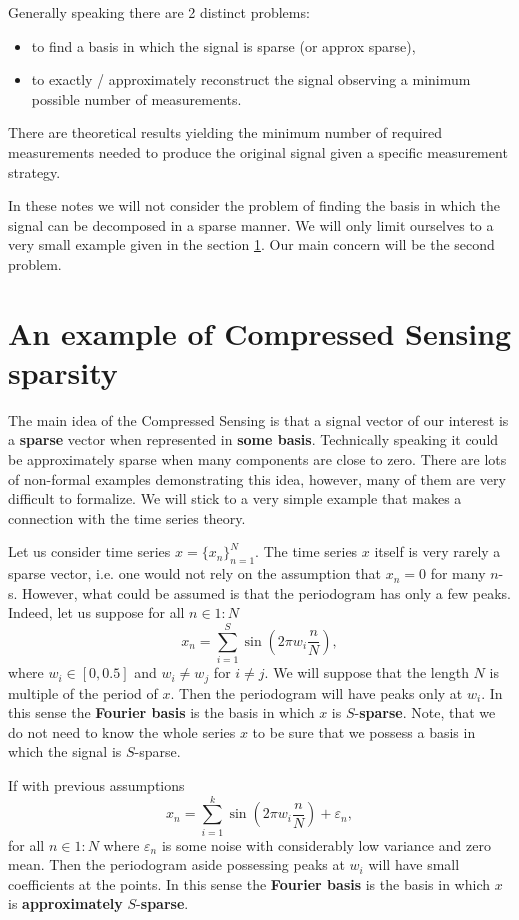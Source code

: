 \documentclass[11pt]{article}
\numberwithin{equation}{section}
\theoremstyle{definition}
\begin{document}
Generally speaking there are 2 distinct problems:
\begin{itemize}
    \item to find a basis in which the signal is sparse (or approx sparse),
    \item to exactly / approximately reconstruct the signal observing a minimum possible number of measurements.
\end{itemize}
There are theoretical results yielding the minimum number of required measurements needed to produce the original signal given a specific measurement strategy.

In these notes we will not consider the problem of finding the basis in which the signal can be decomposed in a sparse manner.
We will only limit ourselves to a very small example given in the section \ref{sec:motivation}.
Our main concern will be the second problem.

\section{An example of Compressed Sensing sparsity}
\label{sec:motivation}
The main idea of the Compressed Sensing is that a signal vector of our interest is a \textbf{sparse} vector when represented in \textbf{some basis}.
Technically speaking it could be approximately sparse when many components are close to zero.
There are lots of non-formal examples demonstrating this idea, however, many of them are very difficult to formalize.
We will stick to a very simple example that makes a connection with the time series theory.

Let us consider time series $x = \{x_n\}_{n=1}^N$.
The time series $x$ itself is very rarely a sparse vector, i.e. one would not rely on the assumption that $x_n = 0$ for many $n$-s.
However, what could be assumed is that the periodogram has only a few peaks.
Indeed, let us suppose for all $n \in 1:N$
$$ x_n = \sum_{i=1}^S \sin\left(2 \pi w_i \frac{n}{N}\right), $$
where $w_i \in [0, 0.5]$ and $w_i \neq w_j$ for $i \neq j$.
We will suppose that the length $N$ is multiple of the period of $x$.
Then the periodogram will have peaks only at $w_i$.
In this sense the \textbf{Fourier basis} is the basis in which $x$ is $S$-\textbf{sparse}.
Note, that we do not need to know the whole series $x$ to be sure that we possess a basis in which the signal is $S$-sparse.

If with previous assumptions 
$$ x_n = \sum_{i=1}^k \sin\left(2 \pi w_i \frac{n}{N}\right) + \varepsilon_n, $$
for all $n \in 1:N$
where $\varepsilon_n$ is some noise with considerably low variance and zero mean.
Then the periodogram aside possessing peaks at $w_i$ will have small coefficients at the points.
In this sense the \textbf{Fourier basis} is the basis in which $x$ is \textbf{approximately} $S$-\textbf{sparse}.
\end{document}
